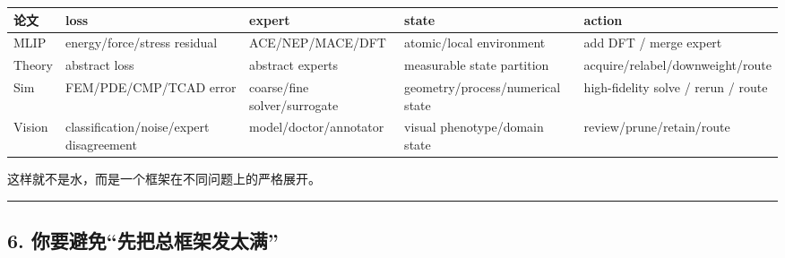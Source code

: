 \documentclass[
  12pt,
]{ctexart}
\begin{document}
\begin{longtable}[]{@{}
  >{\raggedright\arraybackslash}p{}
  >{\raggedright\arraybackslash}p{}
  >{\raggedright\arraybackslash}p{}
  >{\raggedright\arraybackslash}p{}
  >{\raggedright\arraybackslash}p{}@{}}
\toprule\noalign{}
\begin{minipage}[b]{\linewidth}\raggedright
论文
\end{minipage} & \begin{minipage}[b]{\linewidth}\raggedright
loss
\end{minipage} & \begin{minipage}[b]{\linewidth}\raggedright
expert
\end{minipage} & \begin{minipage}[b]{\linewidth}\raggedright
state
\end{minipage} & \begin{minipage}[b]{\linewidth}\raggedright
action
\end{minipage} \\
\midrule\noalign{}
\endhead
\bottomrule\noalign{}
\endlastfoot
MLIP & energy/force/stress residual & ACE/NEP/MACE/DFT & atomic/local
environment & add DFT / merge expert \\
Theory & abstract loss & abstract experts & measurable state partition &
acquire/relabel/downweight/route \\
Sim & FEM/PDE/CMP/TCAD error & coarse/fine solver/surrogate &
geometry/process/numerical state & high-fidelity solve / rerun /
route \\
Vision & classification/noise/expert disagreement &
model/doctor/annotator & visual phenotype/domain state &
review/prune/retain/route \\
\end{longtable}

这样就不是水，而是一个框架在不同问题上的严格展开。

\begin{center}\rule{0.5\linewidth}{0.5pt}\end{center}

\subsection{6.
你要避免``先把总框架发太满''}\label{ux4f60ux8981ux907fux514dux5148ux628aux603bux6846ux67b6ux53d1ux592aux6ee1}
\end{document}
